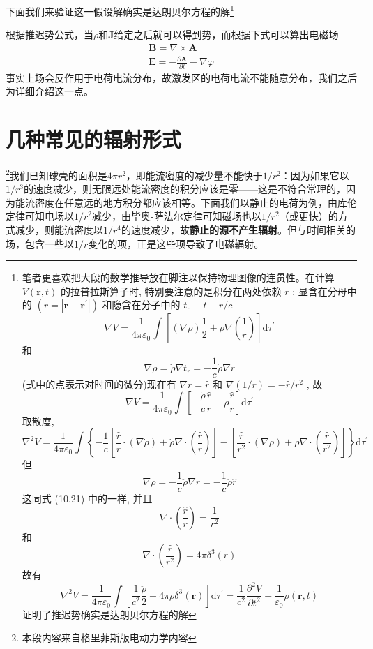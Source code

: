     下面我们来验证这一假设解确实是达朗贝尔方程的解\footnote{笔者更喜欢把大段的数学推导放在脚注以保持物理图像的连贯性。在计算 $V(\boldsymbol{r}, t)$ 的拉普拉斯算子时, 特别要注意的是积分在两处依赖 $r$ : 显含在分母中的 $\left(r=\left|\boldsymbol{r}-\boldsymbol{r}^{\prime}\right|\right)$ 和隐含在分子中的 $t_{\mathrm{r}} \equiv t-r / c$$$\nabla V=\frac{1}{4 \pi \varepsilon_{0}} \int\left[(\nabla \rho) \frac{1}{2}+\rho \nabla\left(\frac{1}{r}\right)\right] \mathrm{d} \tau^{\prime}$$和$$\nabla \rho=\dot{\rho} \nabla t_{r}=-\frac{1}{c} \dot{\rho} \nabla r$$(式中的点表示对时间的微分)现在有 $\nabla r=\hat{r}$ 和 $\nabla(1 / r)=-\hat{r} / r^{2}$ , 故$$\nabla V=\frac{1}{4 \pi \varepsilon_{0}} \int\left[-\frac{\dot{\rho}}{c} \frac{\hat{r}}{r}-\rho \frac{\hat{r}}{r}\right] \mathrm{d} \tau^{\prime}$$取散度,$$\nabla^{2} V=\frac{1}{4 \pi \varepsilon_{0}} \int\left\{-\frac{1}{c}\left[\frac{\hat{r}}{r} \cdot(\nabla \dot{\rho})+\dot{\rho} \nabla \cdot\left(\frac{\hat{r}}{r}\right)\right]-\left[\frac{\hat{r}}{r^{2}} \cdot(\nabla \rho)+\rho \nabla \cdot\left(\frac{\hat{r}}{r^{2}}\right)\right]\right\} \mathrm{d} \tau^{\prime}$$但$$\nabla \dot{\rho}=-\frac{1}{c} \ddot{\rho} \nabla r=-\frac{1}{c} \ddot{\rho} \hat{r}$$这同式 (10.21) 中的一样, 并且$$\nabla \cdot\left(\frac{\hat{r}}{r}\right)=\frac{1}{r^{2}}$$和$$\nabla \cdot\left(\frac{\hat{r}}{r^{2}}\right)=4 \pi \delta^{3}(r)$$故有\[\nabla^{2} V=\frac{1}{4 \pi \varepsilon_{0}} \int\left[\frac{1}{c^{2}} \frac{\ddot{\rho}}{2}-4 \pi \rho \delta^{3}(\boldsymbol{r})\right] \mathrm{d} \tau^{\prime}=\frac{1}{c^{2}} \frac{\partial^{2} V}{\partial t^{2}}-\frac{1}{\varepsilon_{0}} \rho(\boldsymbol{r}, t)\]证明了推迟势确实是达朗贝尔方程的解}

    根据推迟势公式，当$\rho$和$\boldsymbol{J}$给定之后就可以得到势，而根据下式可以算出电磁场
    \begin{equation}
        \begin{gathered}
            \boldsymbol{B} = \nabla \times \boldsymbol{A} \\
            \boldsymbol{E} = - \frac{\partial \boldsymbol{A}}{\partial t} - \nabla \varphi
        \end{gathered}
    \end{equation}
    事实上场会反作用于电荷电流分布，故激发区的电荷电流不能随意分布，我们之后为详细介绍这一点。
\section{几种常见的辐射形式}
    \footnote{本段内容来自格里菲斯版电动力学内容}我们已知球壳的面积是$4 \pi r^2$，即能流密度的减少量不能快于$1/r^2$：因为如果它以$1/r^3$的速度减少，则无限远处能流密度的积分应该是零——这是不符合常理的，因为能流密度在任意远的地方积分都应该相等。下面我们以静止的电荷为例，由库伦定律可知电场以$1/r^2$减少，由毕奥-萨法尔定律可知磁场也以$1/r^2$（或更快）的方式减少，则能流密度以$1/r^4$的速度减少，故\textbf{静止的源不产生辐射}。但与时间相关的场，包含一些以$1/r$变化的项，正是这些项导致了电磁辐射。

